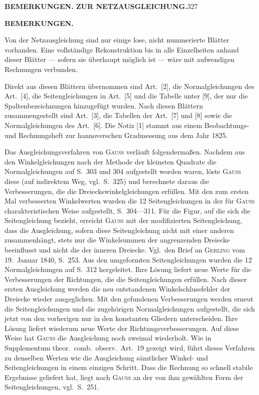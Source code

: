 \noindent\textbf{BEMERKUNGEN. ZUR NETZAUSGLEICHUNG.}\hfill327

\begin{center}\textbf{BEMERKUNGEN.}\end{center}

\par\noindent\hspace*{\parindent}Von der Netzausgleichung sind nur einige lose, nicht nummerierte Blätter
vorhanden. Eine vollständige Rekonstruktion bis in alle Einzelheiten anhand
dieser Blätter --- sofern sie überhaupt möglich ist --- wäre mit
aufwendigen Rechnungen verbunden.

\par\noindent\hspace*{\parindent}Direkt aus diesen Blättern übernommen sind Art.~[2], die Normalgleichungen
des Art.~[4], die Seitengleichungen in Art.~[5] und die Tabelle unter [9],
der nur die Spaltenbezeichnungen hinzugefügt wurden. Nach diesen Blättern
zusammengestellt sind Art.~[3], die Tabellen der Art.~[7] und [8] sowie die
Normalgleichungen des Art.~[6]. Die Notiz [1] stammt aus einem Beobachtungs-
und Rechnungsheft zur hannoverschen Gradmessung aus dem Jahr 1825.

\par\noindent\hspace*{\parindent}Das Ausgleichungsverfahren von \textsc{Gauss} verläuft folgendermaßen.
Nachdem aus den Winkelgleichungen nach der Methode der kleinsten Quadrate
die Normalgleichungen auf S.~303 und 304 aufgestellt worden waren, löste
\textsc{Gauss} diese (auf indirektem Weg, vgl.~S.~325) und berechnete daraus
die Verbesserungen, die  die Dreieckswinkelgleichungen erfüllen.
Mit den zum ersten Mal verbesserten Winkelwerten wurden die 12
Seitengleichungen in der für \textsc{Gauss} charakteristischen Weise
aufgestellt, S.~304---311. Für die Figur, auf die sich die Seitengleichung
bezieht, erreicht \textsc{Gauss} mit der modifizierten Seitengleichung, dass
die Ausgleichung, sofern diese Seitengleichung nicht mit einer anderen
zusammenhängt, stets nur die Winkelsummen der angrenzenden Dreiecke
beeinflusst und nicht die der inneren Dreiecke. Vgl.~den Brief an
\textsc{Gerling} vom 19.~Januar 1840, S.~253. Aus den umgeformten
Seitengleichungen wurden die 12 Normalgleichungen auf S.~312 hergeleitet.
Ihre Lösung liefert neue Werte für die Verbesserungen der Richtungen,
die  die Seitengleichungen erfüllen. Nach dieser
ersten Ausgleichung werden die neu entstandenen Winkelschlussfehler der Dreiecke
wieder ausgeglichen. Mit den gefundenen Verbesserungen werden erneut die
Seitengleichungen und die zugehörigen Normalgleichungen aufgestellt, die
sich jetzt von den vorherigen nur in den konstanten Gliedern unterscheiden.
Ihre Lösung liefert wiederum neue Werte der Richtungsverbesserungen.
Auf diese Weise hat \textsc{Gauss} die Ausgleichung noch zweimal
wiederholt. Wie in Supplementum theor.~comb.~observ.~Art.~19 gezeigt
wird, führt dieses Verfahren zu denselben Werten wie die Ausgleichung
sämtlicher Winkel- und Seitengleichungen in einem einzigen Schritt. Dass
die Rechnung so schnell stabile Ergebnisse geliefert hat, liegt nach
\textsc{Gauss} an der von ihm gewählten Form der Seitengleichungen, vgl.~S.~251.


